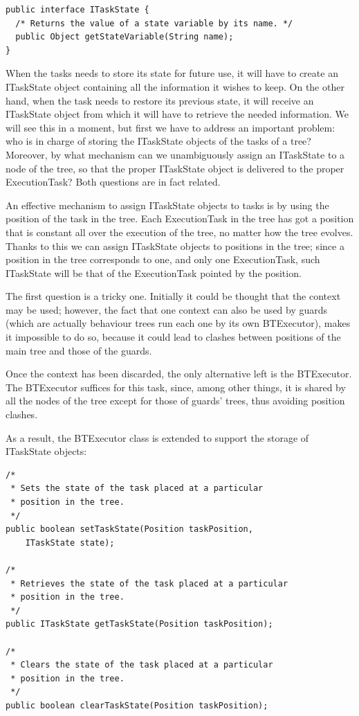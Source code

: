 \documentclass[a4paper,10pt]{article}
\begin{document}
\begin{verbatim}
public interface ITaskState {
  /* Returns the value of a state variable by its name. */
  public Object getStateVariable(String name);
} 
\end{verbatim}

When the tasks needs to store its state for future use, it will have to create an ITaskState object containing all the information it wishes to keep. On the other hand, when the task needs to restore its previous state, it will receive an ITaskState object from which it will have to retrieve the needed information. We will see this in a moment, but first we have to address an important problem: who is in charge of storing the ITaskState objects of the tasks of a tree? Moreover, by what mechanism can we unambiguously assign an ITaskState to a node of the tree, so that the proper ITaskState object is delivered to the proper ExecutionTask? Both questions are in fact related.

An effective mechanism to assign ITaskState objects to tasks is by using the position of the task in the tree. Each ExecutionTask in the tree has got a position that is constant all over the execution of the tree, no matter how the tree evolves. Thanks to this we can assign ITaskState objects to positions in the tree; since a position in the tree corresponds to one, and only one ExecutionTask, such ITaskState will be that of the ExecutionTask pointed by the position.

The first question is a tricky one. Initially it could be thought that the context may be used; however, the fact that one context can also be used by guards (which are actually behaviour trees run each one by its own BTExecutor), makes it impossible to do so, because it could lead to clashes between positions of the main tree and those of the guards.

Once the context has been discarded, the only alternative left is the BTExecutor. The BTExecutor suffices for this task, since, among other things, it is shared by all the nodes of the tree except for those of guards' trees, thus avoiding position clashes.

As a result, the BTExecutor class is extended to support the storage of ITaskState objects:

\begin{verbatim}
/* 
 * Sets the state of the task placed at a particular 
 * position in the tree. 
 */
public boolean setTaskState(Position taskPosition, 
	ITaskState state);

/* 
 * Retrieves the state of the task placed at a particular 
 * position in the tree. 
 */
public ITaskState getTaskState(Position taskPosition);

/* 
 * Clears the state of the task placed at a particular 
 * position in the tree. 
 */
public boolean clearTaskState(Position taskPosition);
\end{verbatim}
\end{document}
